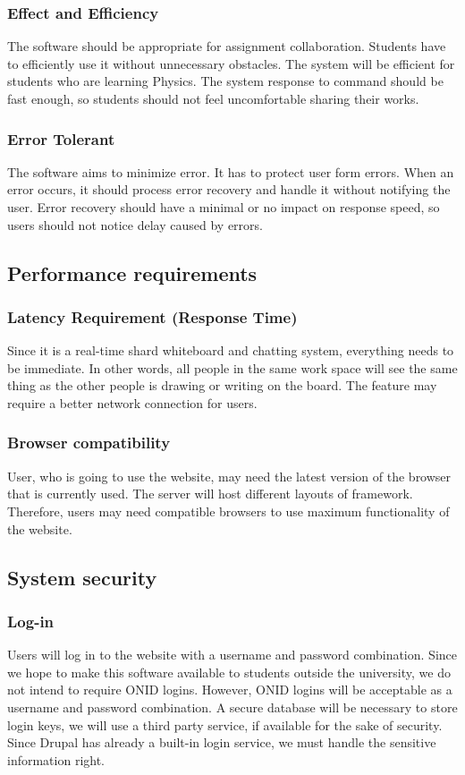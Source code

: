 \documentclass[10pt]{article}
\begin{document}
        \subsubsection{Effect and Efficiency}
            The software should be appropriate for assignment collaboration. Students have to efficiently use it without unnecessary obstacles. The system will be efficient for students who are learning Physics. The system response to command should be fast enough, so students should not feel uncomfortable sharing their works.
 
        \subsubsection{Error Tolerant}
            The software aims to minimize error. It has to protect user form errors. When an error occurs, it should process error recovery and handle it without notifying the user. Error recovery should have a minimal or no impact on response speed, so users should not notice delay caused by errors.

    \subsection{Performance requirements}
        \subsubsection{Latency Requirement (Response Time)}
            Since it is a real-time shard whiteboard and chatting system, everything needs to be immediate. In other words, all people in the same work space will see the same thing as the other people is drawing or writing on the board. The feature may require a better network connection for users.
        \subsubsection{Browser compatibility}
            User, who is going to use the website, may need the latest version of the browser that is currently used. The server will host different layouts of framework. Therefore, users may need compatible browsers to use maximum functionality of the website. 
            

    \subsection{System security}
        \subsubsection{Log-in}
            Users will log in to the website with a username and password combination. Since we hope to make this software available to students outside the university, we do not intend to require ONID logins. However, ONID logins will be acceptable as a username and password combination. A secure database will be necessary to store login keys, we will use a third party service, if available for the sake of security.
            Since Drupal has already a built-in login service, we must handle the sensitive information right.
\end{document}
